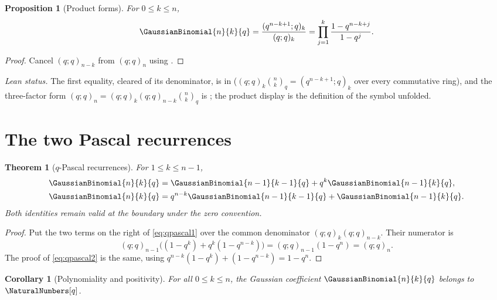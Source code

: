 \documentclass[11pt,a4paper,oneside,openany]{book}
\newtheorem{theorem}{Theorem}[chapter]
\newtheorem{proposition}[proposition]{Proposition}
\newtheorem{corollary}[corollary]{Corollary}
\theoremstyle{definition}
\theoremstyle{remark}
\begin{document}
\begin{proposition}[Product forms]\label{prop:qbinom-products}
For $0\le k\le n$,
\[
 \GaussianBinomial{n}{k}{q}
 =\frac{(q^{n-k+1};q)_k}{(q;q)_k}
 =\prod_{j=1}^{k}\frac{1-q^{n-k+j}}{1-q^j}.
\]
\end{proposition}

\begin{proof}
Cancel $(q;q)_{n-k}$ from $(q;q)_n$ using .
\end{proof}

\emph{Lean status.}  The first equality, cleared of its denominator, is
 in
 ($(q;q)_k\binom nk_q=(q^{n-k+1};q)_k$ over every commutative
ring), and the three-factor form
$(q;q)_n=(q;q)_k(q;q)_{n-k}\binom nk_q$ is
; the product display is
the definition of the symbol unfolded.


\section{The two Pascal recurrences}

\begin{theorem}[$q$-Pascal recurrences]\label{thm:qpascal}
For $1\le k\le n-1$,
\begin{align}
 \GaussianBinomial{n}{k}{q}&=\GaussianBinomial{n-1}{k-1}{q}+q^k\GaussianBinomial{n-1}{k}{q},\label{eq:qpascal1}\\
 \GaussianBinomial{n}{k}{q}&=q^{n-k}\GaussianBinomial{n-1}{k-1}{q}+\GaussianBinomial{n-1}{k}{q}.\label{eq:qpascal2}
\end{align}
Both identities remain valid at the boundary under the zero convention.
\end{theorem}

\begin{proof}
Put the two terms on the right of \eqref{eq:qpascal1} over the common denominator $(q;q)_k(q;q)_{n-k}$.  Their numerator is
\[
 (q;q)_{n-1}\bigl((1-q^k)+q^k(1-q^{n-k})\bigr)
 =(q;q)_{n-1}(1-q^n)=(q;q)_n.
\]
The proof of \eqref{eq:qpascal2} is the same, using
\(
 q^{n-k}(1-q^k)+(1-q^{n-k})=1-q^n.
\)
\end{proof}

\begin{corollary}[Polynomiality and positivity]\label{cor:positivity}
For all $0\le k\le n$, the Gaussian coefficient $\GaussianBinomial{n}{k}{q}$ belongs to $\NaturalNumbers[q]$.
\end{corollary}
\end{document}
